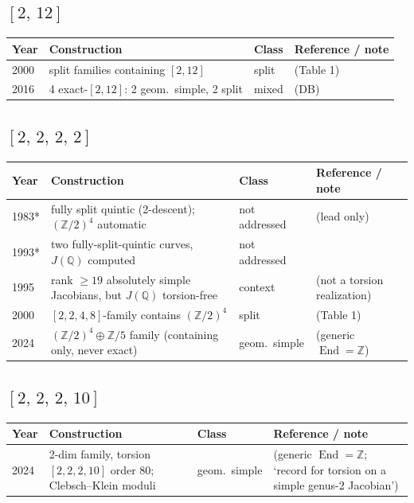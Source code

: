 \documentclass[10pt]{amsart}
\begin{document}
\subsection*{$[2,\,12]$}
\begin{longtable}{p{0.9cm} p{7.6cm} p{2.3cm} p{4.2cm}}
\hline Year & Construction & Class & Reference / note \\ \hline
2000 & split families containing $[2,12]$ & split & \cite{HLP2000} (Table 1)\\
2016 & 4 exact-$[2,12]$: 2 geom.\ simple, 2 split & mixed & \cite{BSSVY} (DB)\\
\hline\end{longtable}
\subsection*{$[2,\,2,\,2,\,2]$}
\begin{longtable}{p{0.9cm} p{7.6cm} p{2.3cm} p{4.2cm}}
\hline Year & Construction & Class & Reference / note \\ \hline
1983* & fully split quintic (2-descent); $(\mathbb{Z}/2)^4$ automatic & not addressed & \cite{Cassels1983} (lead only)\\
1993* & two fully-split-quintic curves, $J(\mathbb{Q})$ computed & not addressed & \cite{GordonGrant1993}\\
1995 & rank $\ge 19$ absolutely simple Jacobians, but $J(\mathbb{Q})$ torsion-free & context & \cite{Stoll1995} (not a torsion realization)\\
2000 & $[2,2,4,8]$-family contains $(\mathbb{Z}/2)^4$ & split & \cite{HLP2000} (Table 1)\\
2024 & $(\mathbb{Z}/2)^4 \oplus \mathbb{Z}/5$ family (containing only, never exact) & geom.\ simple & \cite{Elkies2024} (generic $\operatorname{End}=\mathbb{Z}$)\\
\hline\end{longtable}
\subsection*{$[2,\,2,\,2,\,10]$}
\begin{longtable}{p{0.9cm} p{7.6cm} p{2.3cm} p{4.2cm}}
\hline Year & Construction & Class & Reference / note \\ \hline
2024 & 2-dim family, torsion $[2,2,2,10]$ order 80; Clebsch--Klein moduli & geom.\ simple & \cite{Elkies2024} (generic $\operatorname{End}=\mathbb{Z}$; `record for torsion on a simple genus-2 Jacobian')\\
\hline\end{longtable}
\end{document}
